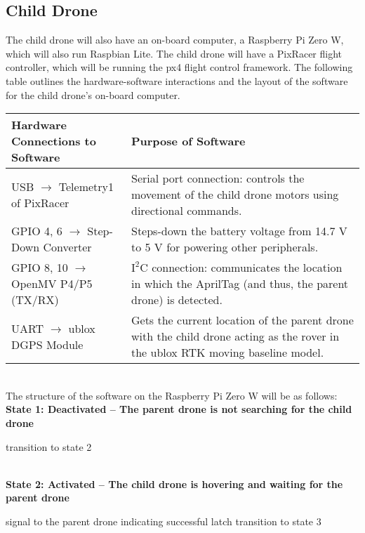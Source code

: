 \documentclass[paper=a4, fontsize=10pt]{scrartcl}
\begin{document}
\subsection*{Child Drone}
The child drone will also have an on-board computer, a Raspberry Pi Zero W, which will also run Raspbian Lite. The child drone will have a PixRacer flight controller, which will be running the px4 flight control framework. The following table outlines the hardware-software interactions and the layout of the software for the child drone's on-board computer.
\begin{table}[h!]
	\centering
	\begin{tabular}{|p{}|p{}|}
		\hline
		\textbf{Hardware Connections to Software} & \textbf{Purpose of Software}\\%
		\hline
		\hline
		USB $\rightarrow$ Telemetry1 of PixRacer & Serial port connection: controls the movement of the child drone motors using directional commands.\\%
		\hline
		GPIO 4, 6 $\rightarrow$ Step-Down Converter & Steps-down the battery voltage from 14.7 V to 5 V for powering other peripherals.\\%
		\hline
		GPIO 8, 10 $\rightarrow$ OpenMV P4/P5 (TX/RX) & $\text{I}^2\text{C}$ connection: communicates the location in which the AprilTag (and thus, the parent drone) is detected.\\%
		\hline
		UART $\rightarrow$ ublox DGPS Module & Gets the current location of the parent drone with the child drone acting as the rover in the ublox RTK moving baseline model.\\%
		\hline
	\end{tabular}
\end{table}
\hfill\\%
The structure of the software on the Raspberry Pi Zero W will be as follows:
\hfill\\%
\textbf{State 1: Deactivated -- The parent drone is not searching for the child drone}\\%
\begin{algorithm}[H]
	transition to state 2\;
\end{algorithm}
\hfill\\%
\textbf{State 2: Activated -- The child drone is hovering and waiting for the parent drone}\\%
\begin{algorithm}[H]
	signal to the parent drone indicating successful latch\;
	transition to state 3\;
\end{algorithm}
\end{document}
